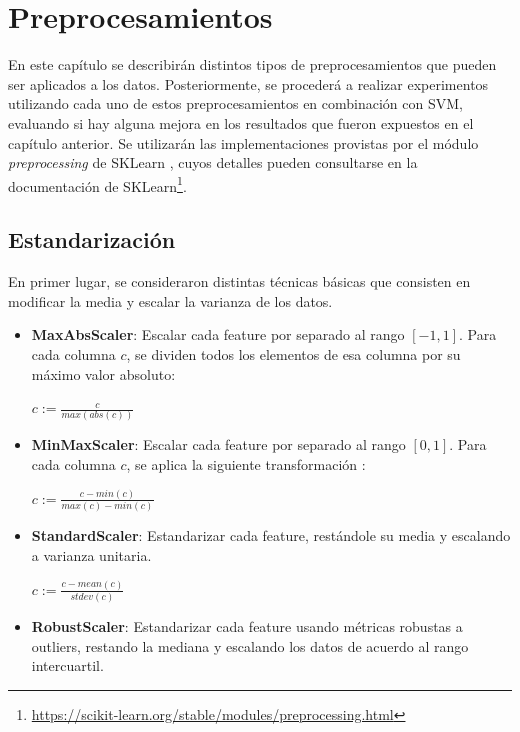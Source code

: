\chapter{Preprocesamientos}

En este capítulo se describirán distintos tipos de preprocesamientos que pueden ser aplicados a los datos. Posteriormente, se procederá a realizar experimentos utilizando cada uno de estos preprocesamientos en combinación con SVM, evaluando si hay alguna mejora en los resultados que fueron expuestos en el capítulo anterior. Se utilizarán las implementaciones provistas por el módulo \textit{preprocessing} de SKLearn \cite{sklearn_api}, cuyos detalles pueden consultarse en la documentación de SKLearn\footnote{ \url{https://scikit-learn.org/stable/modules/preprocessing.html} }. 

\section { Estandarización }

En primer lugar, se consideraron distintas técnicas básicas que consisten en modificar la media y escalar la varianza de los datos. \cite{han2012mining}

\begin{itemize}
\item \textbf{MaxAbsScaler}: Escalar cada feature por separado al rango $[-1,1]$. Para cada columna $c$, se dividen todos los elementos de esa columna por su máximo valor absoluto:

\begin{center}
$ c := \frac{c}{max(abs(c))} $
\end{center}

\item \textbf{MinMaxScaler}: Escalar cada feature por separado al rango $[0,1]$. Para cada columna $c$, se aplica la siguiente transformación \cite{han2012mining}:

\begin{center}
$ c := \frac{ c - min(c) } { max(c) - min(c) }$
\end{center}

\item \textbf{StandardScaler}: Estandarizar cada feature, restándole su media y escalando a varianza unitaria.

\begin{center}
$ c := \frac{ c - mean(c) } { stdev(c) }$
\end{center}

\item \textbf{RobustScaler}: Estandarizar cada feature usando métricas robustas a outliers, restando la mediana y escalando los datos de acuerdo al rango intercuartil.

\end{itemize}

